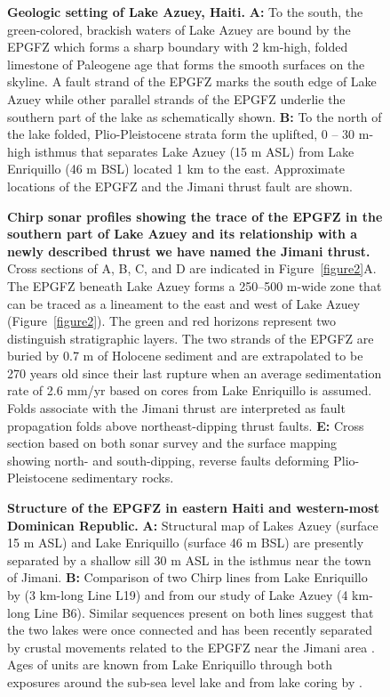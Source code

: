 \documentclass[linenumbers,draft]{agujournal}
\begin{document}
\begin{figure}
\centering
\caption{\textbf{Geologic setting of Lake Azuey, Haiti.} \textbf{A:} To the south, the green-colored, brackish waters of Lake Azuey are bound by the EPGFZ which forms a sharp boundary with 2 km-high, folded limestone of Paleogene age that forms the smooth surfaces on the skyline. A fault strand of the EPGFZ marks the south edge of Lake Azuey while other parallel strands of the EPGFZ underlie the southern part of the lake as schematically shown. \textbf{B:} To the north of the lake folded, Plio-Pleistocene strata form the uplifted, 0 -- 30 m-high isthmus that separates Lake Azuey (15 m ASL) from Lake Enriquillo (46 m BSL) located 1 km to the east. Approximate locations of the EPGFZ and the Jimani thrust fault are shown.}
\label{figure4}
\end{figure}

\begin{figure}
\centering
\caption{\textbf{Chirp sonar profiles showing the trace of the EPGFZ in the southern part of Lake Azuey and its relationship with a newly described thrust we have named the Jimani thrust.} Cross sections of A, B, C, and D are indicated in Figure~\ref{figure2}A. The EPGFZ beneath Lake Azuey forms a 250--500 m-wide zone that can be traced as a lineament to the east and west of Lake Azuey (Figure~\ref{figure2}). The green and red horizons represent two distinguish stratigraphic layers. The two strands of the EPGFZ are buried by 0.7 m of Holocene sediment and are extrapolated to be 270 years old since their last rupture when an average sedimentation rate of 2.6 mm/yr based on cores from Lake Enriquillo is assumed. Folds associate with the Jimani thrust are interpreted as fault propagation folds above northeast-dipping thrust faults. \textbf{E:} Cross section based on both sonar survey and the surface mapping \citep{mann1991overview} showing north- and south-dipping, reverse faults deforming Plio-Pleistocene sedimentary rocks.}
\label{figure5}
\end{figure}

\begin{figure}
\centering
\caption{\textbf{Structure of the EPGFZ in eastern Haiti and western-most Dominican Republic.} \textbf{A:} Structural map of Lakes Azuey (surface 15 m ASL) and Lake Enriquillo (surface 46 m BSL) are presently separated by a shallow sill 30 m ASL in the isthmus near the town of Jimani. \textbf{B:} Comparison of two Chirp lines from Lake Enriquillo by \citet{rios2013holocene} (3 km-long Line L19) and from our study of Lake Azuey (4 km-long Line B6). Similar sequences present on both lines suggest that the two lakes were once connected and has been recently separated by crustal movements related to the EPGFZ near the Jimani area \citep{greer2006decadal,medley2007paleosalinity,rios2013holocene}. Ages of units are known from Lake Enriquillo through both exposures around the sub-sea level lake and from lake coring by \citet{rios2013holocene}.}
\label{figure6}
\end{figure}
\end{document}
